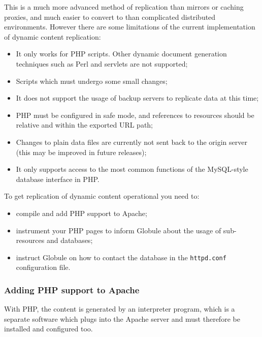 \documentclass[10pt,a4paper]{article}
\makeatletter
\newenvironment{p}{\@open{P}{}}{\@close{P}}
\newenvironment{p}{}{\par}
\makeatother
\begin{document}
\begin{p}
This is a much more advanced method of replication than mirrors or caching
proxies, and much easier to convert to than complicated distributed
environments.  However there are some limitations of the current
implementation of dynamic content replication:
\begin{itemize}
\item It only works for PHP scripts.  Other dynamic document generation
techniques such as Perl and servlets are not supported;
\item Scripts which must undergo some small changes;
\item It does not support the usage of backup servers to replicate data at
this time;
\item PHP must be configured in safe mode, and references to resources should
be relative and within the exported URL path;
\item Changes to plain data files are currently not sent back to the origin
server (this may be improved in future releases);
\item It only supports access to the most common functions of the MySQL-style
database interface in PHP.
\end{itemize}
\end{p}

\begin{p}
To get replication of dynamic content operational you need to:
\begin{itemize}
\item compile and add PHP support to Apache;
\item instrument your PHP pages to inform Globule about the usage
      of sub-resources and databases;
\item instruct Globule on how to contact the database in the \verb!httpd.conf!
      configuration file.
\end{itemize}
\end{p}

\subsubsection{Adding PHP support to Apache}

\begin{p}
With PHP, the content is generated by an interpreter program, which is a
separate software which plugs into the Apache server and must therefore be
installed and configured too.
\end{p}
\end{document}
